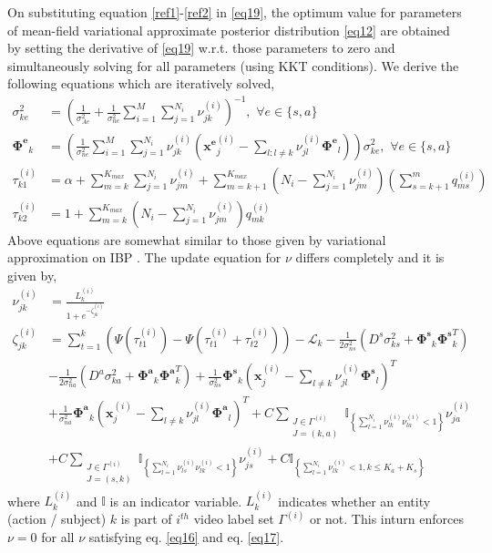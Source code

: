 \documentclass[runningheads]{llncs}
\begin{document}
On substituting equation \eqref{ref1}-\eqref{ref2} in \eqref{eq19}, the optimum value for parameters of mean-field variational approximate posterior distribution \eqref{eq12} are obtained by setting the derivative of \eqref{eq19} w.r.t. those parameters to zero and simultaneously solving for all parameters (using KKT conditions). We derive the following equations which are iteratively solved,
\begin{align}
\sigma_{ke}^2 &= \left(\frac{1}{\sigma_{Ae}^2} + \frac{1}{\sigma_{ne}^2}\sum_{i=1}^M \sum_{j=1}^{N_i}\nu_{jk}^{(i)}\right)^{-1}, \,\, \forall e \in \{s,a\} \label{eq20}\\
\mathbf{\Phi^e}_k &= \left(\frac{1}{\sigma_{ne}^2}\sum_{i=1}^M \sum_{j=1}^{N_i} \nu_{jk}^{(i)} \left(\mathbf{x^e}_j^{(i)} - \sum_{l:l\neq k}\nu_{jl}^{(i)}\mathbf{\Phi^e}_l\right)\right)\sigma_{ke}^2, \,\, \forall e \in \{s,a\} \label{eq21}\\
\tau_{k1}^{(i)} &= \alpha + \sum_{m=k}^{K_{max}}\sum_{j=1}^{N_i} \nu_{jm}^{(i)} + \sum_{m=k+1}^{K_{max}} \left(N_i - \sum_{j=1}^{N_i} \nu_{jm}^{(i)}\right)\left(\sum_{s = k+1}^m q_{ms}^{(i)}\right) \label{eq22}\\
\tau_{k2}^{(i)} &= 1 + \sum_{m=k}^{K_{max}} \left(N_i - \sum_{j=1}^{N_i} \nu_{jm}^{(i)}\right)q_{mk}^{(i)} \label{eq23}
\end{align}
Above equations are somewhat similar to those given by variational approximation on IBP \cite{doshi2009variational}. The update equation for $\nu$ differs completely and it is given by,
\begin{align}
\nu_{jk}^{(i)} &= \frac{L_k^{(i)}}{1+e^{-\zeta_{jk}^{(i)}}}  \label{eq24.2}\\
\zeta_{jk}^{(i)} &= \sum_{t=1}^k \left(\Psi(\tau_{t1}^{(i)}) - \Psi(\tau_{t1}^{(i)} + \tau_{t2}^{(i)})\right) - \mathcal{L}_k - \frac{1}{2\sigma_{ns}^2}\left(D^s\sigma_{ks}^2 + \mathbf{\Phi^s}_k\mathbf{\Phi^s}_k^T\right) \nonumber \\
& - \frac{1}{2\sigma_{na}^2}\left(D^a\sigma_{ka}^2 + \mathbf{\Phi^a}_k\mathbf{\Phi^a}_k^T\right) 
+ \frac{1}{\sigma_{ns}^2}  \mathbf{\Phi^s}_k\left(\mathbf{x}_j^{(i)} - \sum_{l\neq k} \nu_{jl}^{(i)}\mathbf{\Phi^s}_l\right)^T \nonumber \\
& + \frac{1}{\sigma_{na}^2}  \mathbf{\Phi^a}_k\left(\mathbf{x}_j^{(i)} - \sum_{l\neq k} \nu_{jl}^{(i)}\mathbf{\Phi^a}_l\right)^T + C\sum_{\substack{J\in \Gamma^{(i)} \\ J=(k,a)}} \mathbb{I}_{\left\lbrace\sum_{l=1}^{N_i}\nu_{lk}^{(i)}\nu_{la}^{(i)} < 1\right\rbrace} \nu_{ja}^{(i)}  \nonumber \\
&+ C\sum_{\substack{J\in \Gamma^{(i)} \\ J=(s,k)}} \mathbb{I}_{\left\lbrace\sum_{l=1}^{N_i}\nu_{ls}^{(i)}\nu_{lk}^{(i)} < 1\right\rbrace} \nu_{js}^{(i)} + C \mathbb{I}_{\left\lbrace\sum_{l=1}^{N_i}\nu_{lk}^{(i)} < 1, k \leq K_a + K_s\right\rbrace} \label{eq25.2}
\end{align}
where $L_k^{(i)}$ and $\mathbb{I}$ is an indicator variable. $L_k^{(i)}$ indicates whether an entity (action / subject) $k$ is part of $i^{th}$ video label set $\Gamma^{(i)}$ or not. This inturn enforces $\nu = 0$ for all $\nu$ satisfying eq. \eqref{eq16} and eq. \eqref{eq17}. 
\end{document}
